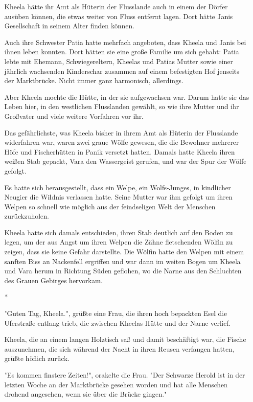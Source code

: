 \documentclass[10pt, a4paper, oneside]{book}
\begin{document}
\begin{multicols}{2}
Kheela hätte ihr Amt als Hüterin der Flusslande auch in einem der Dörfer ausüben können, die etwas weiter von Fluss entfernt lagen. Dort hätte Janis Gesellschaft in seinem Alter finden können. 

Auch ihre Schwester Patia hatte mehrfach angeboten, dass Kheela und Janis bei ihnen leben konnten. Dort hätten sie eine große Familie um sich gehabt: Patia lebte mit Ehemann, Schwiegereltern, Kheelas und Patias Mutter sowie einer jährlich wachsenden Kinderschar zusammen auf einem befestigten Hof jenseits der Marktbrücke. Nicht immer ganz harmonisch, allerdings. 

Aber Kheela mochte die Hütte, in der sie aufgewachsen war. Darum hatte sie das Leben hier, in den westlichen Flusslanden gewählt, so wie ihre Mutter und ihr Großvater und viele weitere Vorfahren vor ihr. 

Das gefährlichste, was Kheela bisher in ihrem Amt als Hüterin der Flusslande widerfahren war, waren zwei graue Wölfe gewesen, die die Bewohner mehrerer Höfe und Fischerhütten in Panik versetzt hatten. Damals hatte Kheela ihren weißen Stab gepackt, Vara den Wassergeist gerufen, und war der Spur der Wölfe gefolgt. 

Es hatte sich herausgestellt, dass ein Welpe, ein Wolfs-Junges, in kindlicher Neugier die Wildnis verlassen hatte. Seine Mutter war ihm gefolgt um ihren Welpen so schnell wie möglich aus der feindseligen Welt der Menschen zurückzuholen. 

Kheela hatte sich damals entschieden, ihren Stab deutlich auf den Boden zu legen, um der aus Angst um ihren Welpen die Zähne fletschenden Wölfin zu zeigen, dass sie keine Gefahr darstellte. Die Wölfin hatte den Welpen mit einem sanften Biss an Nackenfell ergriffen und war dann im weiten Bogen um Kheela und Vara herum in Richtung Süden geflohen, wo die Narne aus den Schluchten des Grauen Gebirges hervorkam. 

\begin{center}
    * 
\end{center}

"Guten Tag, Kheela.", grüßte eine Frau, die ihren hoch bepackten Esel die 
Uferstraße entlang trieb, die zwischen Kheelas Hütte und der Narne verlief.

Kheela, die an einem langen Holztisch saß und damit beschäftigt war, die Fische auszunehmen, die sich während der Nacht in ihren Reusen verfangen hatten, grüßte höflich zurück. 

"Es kommen finstere Zeiten!", orakelte die Frau. "Der Schwarze Herold ist in der letzten Woche an der Marktbrücke gesehen worden und hat alle Menschen drohend angesehen, wenn sie über die Brücke gingen." 


\end{multicols}
\end{document}
